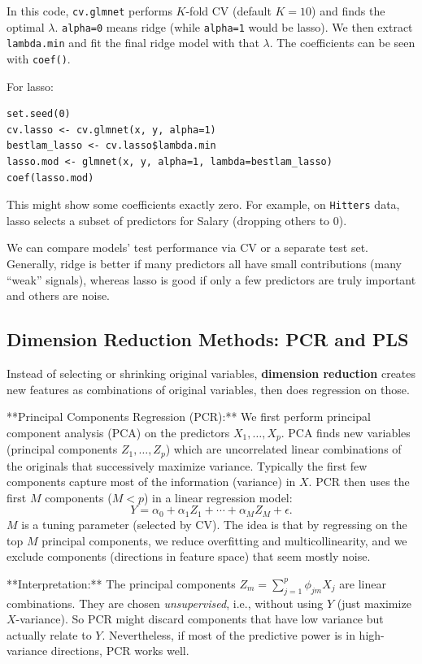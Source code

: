 \documentclass[11pt]{article}
\begin{document}
In this code, \texttt{cv.glmnet} performs $K$-fold CV (default $K=10$) and finds the optimal $\lambda$. \texttt{alpha=0} means ridge (while \texttt{alpha=1} would be lasso). We then extract \texttt{lambda.min} and fit the final ridge model with that $\lambda$. The coefficients can be seen with \texttt{coef()}.

For lasso:
\begin{verbatim}
set.seed(0)
cv.lasso <- cv.glmnet(x, y, alpha=1)
bestlam_lasso <- cv.lasso$lambda.min
lasso.mod <- glmnet(x, y, alpha=1, lambda=bestlam_lasso)
coef(lasso.mod)
\end{verbatim}
This might show some coefficients exactly zero. For example, on \texttt{Hitters} data, lasso selects a subset of predictors for Salary (dropping others to 0). 

We can compare models' test performance via CV or a separate test set. Generally, ridge is better if many predictors all have small contributions (many “weak” signals), whereas lasso is good if only a few predictors are truly important and others are noise.

\subsection{Dimension Reduction Methods: PCR and PLS}
Instead of selecting or shrinking original variables, \textbf{dimension reduction} creates new features as combinations of original variables, then does regression on those. 

**Principal Components Regression (PCR):** We first perform principal component analysis (PCA) on the predictors $X_1,\ldots,X_p$. PCA finds new variables (principal components $Z_1,\ldots,Z_p$) which are uncorrelated linear combinations of the originals that successively maximize variance. Typically the first few components capture most of the information (variance) in $X$. PCR then uses the first $M$ components ($M < p$) in a linear regression model:
\[ Y = \alpha_0 + \alpha_1 Z_1 + \cdots + \alpha_M Z_M + \epsilon. \]
$M$ is a tuning parameter (selected by CV). The idea is that by regressing on the top $M$ principal components, we reduce overfitting and multicollinearity, and we exclude components (directions in feature space) that seem mostly noise.

**Interpretation:** The principal components $Z_m = \sum_{j=1}^p \phi_{jm} X_j$ are linear combinations. They are chosen \emph{unsupervised}, i.e., without using $Y$ (just maximize $X$-variance). So PCR might discard components that have low variance but actually relate to $Y$. Nevertheless, if most of the predictive power is in high-variance directions, PCR works well.
\end{document}
